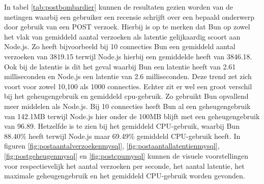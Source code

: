 In tabel \ref{tab:postbombardier} kunnen de resultaten gezien worden van de metingen waarbij 
een gebruiker een recensie schrijft over een bepaald onderwerp door gebruik van een POST verzoek.
Hierbij is op te merken dat Bun op zowel het vlak van gemiddeld aantal verzoeken als latentie gelijkaardig scoort aan Node.js. Zo heeft bijvoorbeeld bij 10 connecties Bun
een gemiddeld aantal verzoeken van 3819.15 terwijl Node.js hierbij een gemiddelde heeft van 3846.18. 
Ook bij de latentie is dit het geval waarbij Bun een latentie heeft van 2.61 milliseconden en Node.js een latentie van 2.6 milliseconden.
Deze trend zet zich voort voor zowel 10,100 als 1000 connecties.
Echter zit er wel een groot verschil bij het geheugengebruik en gemiddeld cpu-gebruik. Zo gebruikt Bun opvallend meer middelen als Node.js.
Bij 10 connecties heeft Bun al een geheugengebruik van 142.1MB terwijl Node.js hier onder de 100MB blijft met een geheugengebruik van 96.89.
Hetzelfde is te zien bij het gemiddeld CPU-gebruik, waarbij Bun 88.40\% heeft terwijl Node.js maar 69.49\% gemiddeld CPU-gebruik heeft.
In figuren \ref{fig:postaantalverzoekenmysql}, \ref{fig:postaantallatentienmysql}, \ref{fig:postgeheugenmysql} en \ref{fig:postcpumysql} kunnen de visuele voorstellingen 
voor respectievelijk het aantal verzoeken per seconde, het aantal latentie, het maximale geheugengebruik en het gemiddeld CPU-gebruik worden gevonden.
